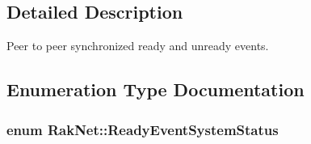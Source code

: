 \subsection{Detailed Description}
Peer to peer synchronized ready and unready events. 

\subsection{Enumeration Type Documentation}
\hypertarget{group___r_e_a_d_y___e_v_e_n_t___g_r_o_u_p_gaf87e91389822570de07c01ccb37b0bbf}{
\subsubsection[{Ready\-Event\-System\-Status}]{\setlength{\rightskip}{0pt plus 5cm}enum {\bf Rak\-Net\-::\-Ready\-Event\-System\-Status}}}\label{group___r_e_a_d_y___e_v_e_n_t___g_r_o_u_p_gaf87e91389822570de07c01ccb37b0bbf}
